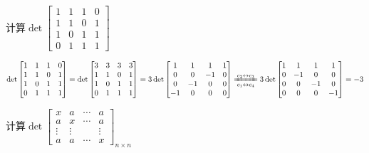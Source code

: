                 \begin{example}
                    计算$\det\begin{bmatrix}1&1&1&0\\1&1&0&1\\1&0&1&1\\0&1&1&1\end{bmatrix}$
                \end{example}

                \begin{solution}
                    $\det\begin{bmatrix}1&1&1&0\\1&1&0&1\\1&0&1&1\\0&1&1&1\end{bmatrix}=\det\begin{bmatrix}3&3&3&3\\1&1&0&1\\1&0&1&1\\0&1&1&1\end{bmatrix}=3\det\begin{bmatrix}1&1&1&1\\0&0&-1&0\\0&-1&0&0\\-1&0&0&0\end{bmatrix}\xlongequal[c_1\leftrightarrow c_4]{c_2\leftrightarrow c_3}3\det\begin{bmatrix}1&1&1&1\\0&-1&0&0\\0&0&-1&0\\0&0&0&-1\end{bmatrix}=-3$
                \end{solution}

                \begin{example}
                    计算$\det\begin{bmatrix}x&a&\cdots&a\\a&x&\cdots&a\\\vdots&\vdots&&\vdots\\a&a&\cdots&x\end{bmatrix}_{n\times n}$
                \end{example}

